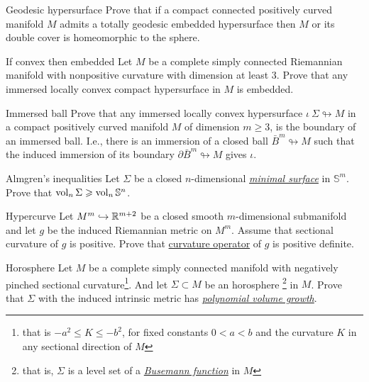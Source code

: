 \documentclass[twoside]{book}
\begin{document}
\begin{pr}{\easy}{Geodesic hypersurface}\label{Geodesic hypersurface}
Prove that if a compact connected positively curved manifold $M$ admits a totally geodesic embedded hypersurface then $M$ or its double cover is homeomorphic to the sphere.
\end{pr}


\begin{pr}{}{If convex then embedded}\label{If convex then embedded} Let $M$ be a complete simply connected Riemannian manifold with nonpositive curvature with dimension at least $3$.
Prove that any  immersed locally convex
compact hypersurface in $M$ is embedded.
\end{pr}

\begin{pr}{\hard}{Immersed ball}\label{Immersed ball}
Prove that any immersed locally convex
hypersurface $\iota\:\Sigma\looparrowright M$
in a compact positively curved manifold $M$ of dimension $m\ge 3$, is the boundary of an immersed ball. 
I.e., there is an immersion of a closed ball $\bar B^m\looparrowright M$ such that the induced immersion of its boundary $\partial \bar B^m\looparrowright M$ gives $\iota$.
\end{pr}

\begin{pr}{}{Almgren's inequalities}\label{almgren} 
Let $\Sigma$ be a closed $n$-dimensional 
\hyperref[Minimal surface]{\emph{minimal surface}} 
in $\mathbb{S}^m$.
Prove that
$\operatorname{\rm vol}_n \Sigma\geqslant \operatorname{\rm vol}_n \mathbb{S}^n$.
\end{pr}


\begin{pr}{}{Hypercurve}\label{codim=2}
Let $M^m\hookrightarrow \mathbb{R}^{m+2}$ be a closed smooth $m$-dimensional
submanifold and let  $g$ be the  induced Riemannian metric on $M^m$.
Assume that sectional curvature of $g$ is positive.
Prove that \hyperref[Curvature operator]{curvature operator} of $g$ is positive definite.
\end{pr}

\begin{pr}{}{Horosphere}\label{Horosphere} Let $M$ be a complete simply connected manifold with negatively pin\-ched sectional curvature\footnote{that is $-a^2\le K\le -b^2$, for fixed constants $0<a<b$ and the curvature $K$ in any sectional  direction of $M$}. 
And let $\Sigma\subset M$ be an horosphere%
\footnote{that is, $\Sigma$ is a level set of a 
\hyperref[Busemann function]{\emph{Busemann function}}
in $M$} in $M$.
 Prove that
$\Sigma$ with the  induced intrinsic metric has \hyperref[Polynomial volume growth]{\emph{polynomial volume growth}}.
\end{pr}
\end{document}
